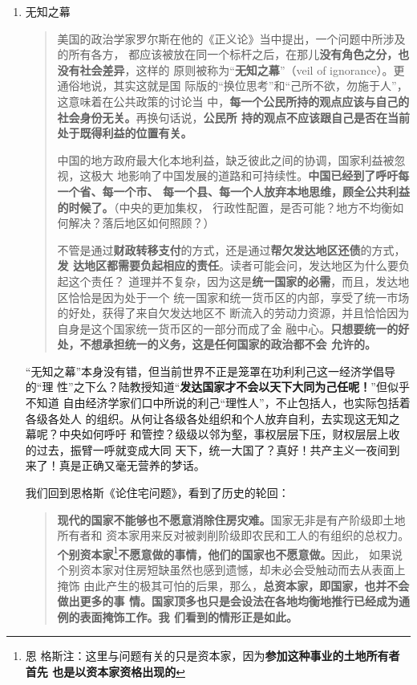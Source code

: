 \begin{enumerate}

\item 无知之幕

  \begin{quotation}
    美国的政治学家罗尔斯在他的《正义论》当中提出，一个问题中所涉及的所有各方，
    都应该被放在同一个标杆之后，在那儿\textbf{没有角色之分，也没有社会差异}，这样的
    原则被称为“\textbf{无知之幕}”（veil of ignorance）。更通俗地说，其实这就是国
    际版的“换位思考”和“己所不欲，勿施于人”，这意味着在公共政策的讨论当
    中，\textbf{每一个公民所持的观点应该与自己的社会身份无关。}再换句话说，\textbf{公民所
      持的观点不应该跟自己是否在当前处于既得利益的位置有关。}


    中国的地方政府最大化本地利益，缺乏彼此之间的协调，国家利益被忽视，这极大
    地影响了中国发展的道路和可持续性。\textbf{中国已经到了呼吁每一个省、每一个市、
      每一个县、每一个人放弃本地思维，顾全公共利益的时候了。}（中央的更加集权，
    行政性配置，是否可能？地方不均衡如何解决？落后地区如何照顾？）


    不管是通过\textbf{财政转移支付}的方式，还是通过\textbf{帮欠发达地区还债}的方式，\textbf{发
      达地区都需要负起相应的责任}。读者可能会问，发达地区为什么要负起这个责任？
    道理并不复杂，因为这是\textbf{统一国家的必需}，而且，发达地区恰恰是因为处于一个
    统一国家和统一货币区的内部，享受了统一市场的好处，获得了来自欠发达地区不
    断流入的劳动力资源，并且恰恰因为自身是这个国家统一货币区的一部分而成了金
    融中心。\textbf{只想要统一的好处，不想承担统一的义务，这是任何国家的政治都不会
      允许的。}
  \end{quotation}

  “无知之幕”本身没有错，但当前世界不正是笼罩在功利利己这一经济学倡导的“理
  性”之下么？陆教授知道“\textbf{发达国家才不会以天下大同为己任呢！}”但似乎不知道
  自由经济学家们口中所说的利己“理性人”，不止包括人，也实际包括着各级各处人
  的组织。从何让各级各处组织和个人放弃自利，去实现这无知之幕呢？中央如何呼吁
  和管控？级级以邻为壑，事权层层下压，财权层层上收的过去，振臂一呼就变成大同
  天下，统一大国了？真好！共产主义一夜间到来了！真是正确又毫无营养的梦话。


  我们回到恩格斯《论住宅问题》，看到了历史的轮回：

  \begin{quotation}
    \textbf{现代的国家不能够也不愿意消除住房灾难。}国家无非是有产阶级即土地所有者和
    资本家用来反对被剥削阶级即农民和工人的有组织的总权力。\textbf{个别资本家}\footnote{恩
      格斯注：这里与问题有关的只是资本家，因为\textbf{参加这种事业的土地所有者首先
        也是以资本家资格出现的}}\textbf{不愿意做的事情，他们的国家也不愿意做。}因此，
    如果说个别资本家对住房短缺虽然也感到遗憾，却未必会受触动而去从表面上掩饰
    由此产生的极其可怕的后果，那么，\textbf{总资本家，即国家，也并不会做出更多的事
      情。国家顶多也只是会设法在各地均衡地推行已经成为通例的表面掩饰工作。我
      们看到的情形正是如此。}
  \end{quotation}


\end{enumerate}
